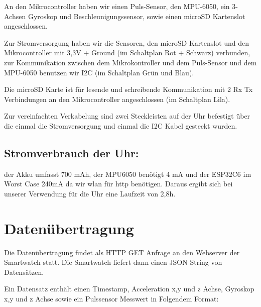 \documentclass[a4paper, 11pt]{article}
\begin{document}
An den Mikrocontroller haben wir einen Puls-Sensor, den MPU-6050, ein 3-Achsen Gyroskop und Beschleunigungssensor, sowie einen microSD Kartenslot angeschlossen.

\noindent Zur Stromversorgung haben wir die Sensoren, den microSD Kartenslot und den Mikrocontroller mit 3,3V + Ground (im Schaltplan Rot + Schwarz) verbunden, zur Kommunikation zwischen dem Mikrokontroller und dem Puls-Sensor und dem MPU-6050 benutzen wir I2C (im Schaltplan Grün und Blau).

\noindent Die microSD Karte ist für lesende und schreibende Kommunikation mit 2 Rx Tx Verbindungen an den Mikrocontroller angeschlossen (im Schaltplan Lila).

\noindent Zur vereinfachten Verkabelung sind zwei Steckleisten auf der Uhr befestigt über die einmal die Stromversorgung und einmal die I2C Kabel gesteckt wurden.

\subsection{Stromverbrauch der Uhr:}
der Akku umfasst 700 mAh, der MPU6050 benötigt 4 mA  und der ESP32C6 im Worst Case 240mA da wir wlan für http benötigen.
Daraus ergibt sich bei unserer Verwendung für die Uhr eine Laufzeit von 2,8h.

\clearpage

\section{Datenübertragung}
Die Datenübertragung findet als HTTP GET Anfrage an den Webserver der Smartwatch statt. Die Smartwatch liefert dann einen JSON String von Datensätzen.

\noindent
Ein Datensatz enthält einen Timestamp, Acceleration x,y und z Achse, Gyroskop x,y und z Achse sowie ein Pulssensor Messwert in Folgendem Format:

\clearpage
\end{document}
